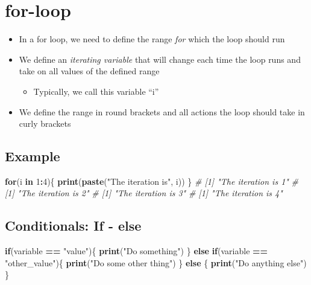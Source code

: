 \documentclass[
]{book}
\newenvironment{Shaded}{\begin{snugshade}}{\end{snugshade}}
\newcommand{\CommentTok}[1]{\textcolor[rgb]{0.56,0.35,0.01}{\textit{#1}}}
\newcommand{\ControlFlowTok}[1]{\textcolor[rgb]{0.13,0.29,0.53}{\textbf{#1}}}
\newcommand{\DecValTok}[1]{\textcolor[rgb]{0.00,0.00,0.81}{#1}}
\newcommand{\FunctionTok}[1]{\textcolor[rgb]{0.13,0.29,0.53}{\textbf{#1}}}
\newcommand{\NormalTok}[1]{#1}
\newcommand{\SpecialCharTok}[1]{\textcolor[rgb]{0.81,0.36,0.00}{\textbf{#1}}}
\newcommand{\StringTok}[1]{\textcolor[rgb]{0.31,0.60,0.02}{#1}}
\providecommand{\tightlist}{%
  \setlength{\itemsep}{0pt}\setlength{\parskip}{0pt}}
\begin{document}
\section{for-loop}\label{for-loop}

\begin{itemize}
\tightlist
\item
  In a for loop, we need to define the range \emph{for} which the loop should run
\item
  We define an \emph{iterating variable} that will change each time the loop runs and take on all values of the defined range

  \begin{itemize}
  \tightlist
  \item
    Typically, we call this variable ``i''
  \end{itemize}
\item
  We define the range in round brackets and all actions the loop should take in curly brackets
\end{itemize}

\subsection{Example}\label{example}

\begin{Shaded}
\begin{Highlighting}[]
\ControlFlowTok{for}\NormalTok{(i }\ControlFlowTok{in} \DecValTok{1}\SpecialCharTok{:}\DecValTok{4}\NormalTok{)\{}
  \FunctionTok{print}\NormalTok{(}\FunctionTok{paste}\NormalTok{(}\StringTok{"The iteration is"}\NormalTok{, i))}
\NormalTok{\}}
\CommentTok{\# [1] "The iteration is 1"}
\CommentTok{\# [1] "The iteration is 2"}
\CommentTok{\# [1] "The iteration is 3"}
\CommentTok{\# [1] "The iteration is 4"}
\end{Highlighting}
\end{Shaded}

\subsection{Conditionals: If - else}\label{conditionals-if---else}

\begin{Shaded}
\begin{Highlighting}[]
\ControlFlowTok{if}\NormalTok{(variable }\SpecialCharTok{==} \StringTok{"value"}\NormalTok{)\{}
  \FunctionTok{print}\NormalTok{(}\StringTok{"Do something"}\NormalTok{)}
\NormalTok{\} }\ControlFlowTok{else} \ControlFlowTok{if}\NormalTok{(variable }\SpecialCharTok{==} \StringTok{"other\_value"}\NormalTok{)\{}
  \FunctionTok{print}\NormalTok{(}\StringTok{"Do some other thing"}\NormalTok{)}
\NormalTok{\} }\ControlFlowTok{else}\NormalTok{ \{}
  \FunctionTok{print}\NormalTok{(}\StringTok{"Do anything else"}\NormalTok{)}
\NormalTok{\}}
\end{Highlighting}
\end{Shaded}
\end{document}

